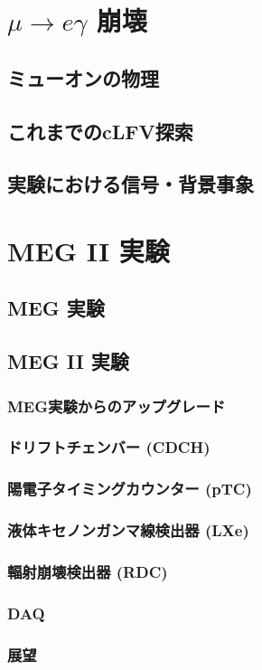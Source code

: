 \documentclass[Yonemoto_master.tex]{subfiles}
\begin{document}
\chapter{$\mu \to e \gamma$ 崩壊}

\section{ミューオンの物理}
\section{これまでのcLFV探索}
\section{実験における信号・背景事象}

\chapter{MEG II 実験}

\section{MEG 実験}
\section{MEG II 実験}
\subsection{MEG実験からのアップグレード}
\subsection{ドリフトチェンバー (CDCH)}
\subsection{陽電子タイミングカウンター (pTC)}
\subsection{液体キセノンガンマ線検出器 (LXe)}
\subsection{輻射崩壊検出器 (RDC)}
\subsection{DAQ}
\subsection{展望}
\end{document}

